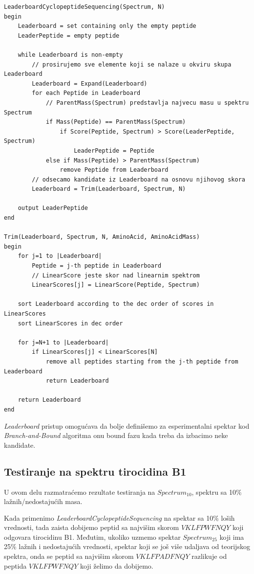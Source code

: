 \begin{lstlisting}
LeaderboardCyclopeptideSequencing(Spectrum, N)
begin
	Leaderboard = set containing only the empty peptide
	LeaderPeptide = empty peptide
	
	while Leaderboard is non-empty
		// prosirujemo sve elemente koji se nalaze u okviru skupa Leaderboard
		Leaderboard = Expand(Leaderboard)
		for each Peptide in Leaderboard
			// ParentMass(Spectrum) predstavlja najvecu masu u spektru Spectrum
			if Mass(Peptide) == ParentMass(Spectrum)
				if Score(Peptide, Spectrum) > Score(LeaderPeptide, Spectrum)
					LeaderPeptide = Peptide
			else if Mass(Peptide) > ParentMass(Spectrum)
				remove Peptide from Leaderboard
		// odsecamo kandidate iz Leaderboard na osnovu njihovog skora
		Leaderboard = Trim(Leaderboard, Spectrum, N)
		
	output LeaderPeptide
end

Trim(Leaderboard, Spectrum, N, AminoAcid, AminoAcidMass)
begin
	for j=1 to |Leaderboard|
		Peptide = j-th peptide in Leaderboard
		// LinearScore jeste skor nad linearnim spektrom
		LinearScores[j] = LinearScore(Peptide, Spectrum)
		
	sort Leaderboard according to the dec order of scores in LinearScores
	sort LinearScores in dec order
	
	for j=N+1 to |Leaderboard|
		if LinearScores[j] < LinearScores[N]
			remove all peptides starting from the j-th peptide from Leaderboard
			return Leaderboard
			
	return Leaderboard
end
\end{lstlisting}

\noindent \textit{Leaderboard} pristup omogućava da bolje definišemo za esperimentalni spektar kod \textit{Branch-and-Bound} algoritma onu bound fazu kada treba da izbacimo neke kandidate. 

\subsection{Testiranje na spektru tirocidina B1}

U ovom delu razmatraćemo rezultate testiranja na $Spectrum_{10}$, spektru sa 10\% lažnih/nedostajućih masa. 

Kada primenimo \textit{LeaderboardCyclopeptideSequencing} na spektar sa 10\% loših vrednosti, tada zaista dobijemo peptid sa najvišim skorom $ VKLFPWFNQY $  koji odgovara tirocidinu B1. Međutim, ukoliko uzmemo spektar $Spectrum_{25}$ koji ima 25\% lažnih i nedostajućih vrednosti, spektar koji se još više udaljava od teorijskog spektra, onda se peptid sa najvišim skorom $ VKLFPADFNQY $ razlikuje od peptida  $ VKLFPWFNQY $ koji želimo da dobijemo.

